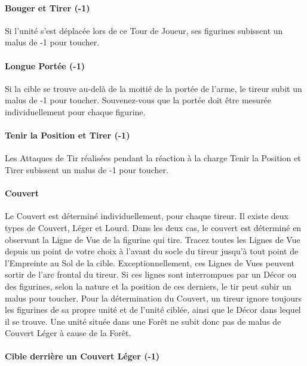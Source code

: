 \paragraph{Bouger et Tirer (-1)}

Si l'unité s'est déplacée lors de ce Tour de Joueur, ses figurines subissent un malus de -1 pour toucher.

\paragraph{Longue Portée (-1)}

Si la cible se trouve au-delà de la moitié de la portée de l'arme, le tireur subit un malus de -1 pour toucher. Souvenez-vous que la portée doit être mesurée individuellement pour chaque figurine.

\paragraph{Tenir la Position et Tirer (-1)}

Les Attaques de Tir réalisées pendant la réaction à la charge Tenir la Position et Tirer subissent un malus de -1 pour toucher.

\paragraph{Couvert}

Le Couvert est déterminé individuellement, pour chaque tireur. Il existe deux types de Couvert, Léger et Lourd. Dans les deux cas, le couvert est déterminé en observant la Ligne de Vue de la figurine qui tire. Tracez toutes les Lignes de Vue depuis un point de votre choix à l'avant du socle du tireur jusqu'à tout point de l'Empreinte au Sol de la cible. Exceptionnellement, ces Lignes de Vues peuvent sortir de l'arc frontal du tireur. Si ces lignes sont interrompues par un Décor ou des figurines, selon la nature et la position de ces derniers, le tir peut subir un malus pour toucher. Pour la détermination du Couvert, un tireur ignore toujours les figurines de sa propre unité et de l'unité ciblée, ainsi que le Décor dans lequel il se trouve. Une unité située dans une Forêt ne subit donc pas de malus de Couvert Léger à cause de la Forêt.

\paragraph{Cible derrière un Couvert Léger (-1)}

